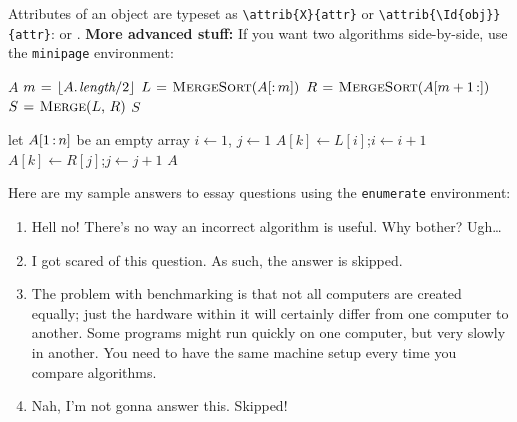 \documentclass[12pt]{article}
\begin{document}
Attributes of an object are typeset as \verb|\attrib{X}{attr}| or \verb|\attrib{\Id{obj}}{attr}|:  or .
\textbf{More advanced stuff:} If you want two algorithms side-by-side, use the \verb|minipage| environment:
\begin{center}
    \begin{minipage}{0.45\textwidth}
    \begin{algorithmic}[1]
            \Return $A$
        \EndIf
        \State $m \mathrel{\hspace{1pt}=\hspace{1pt}} \lfloor A.\hspace*{1pt}\textit{length}/2 \rfloor$
        \State $L \gets \text{\Call{MergeSort}{$A[\subarr m]$}}$
        \State $R \gets \text{\Call{MergeSort}{$A[m+1\subarr]$}}$
        \State $S \gets \text{\Call{Merge}{$L$, $R$}}$
        \Return $S$
    \end{algorithmic}
    \end{minipage}
    \begin{minipage}{0.5\textwidth}
    \begin{algorithmic}[1]
        \State let $A[1\mathinner{:} n]$ be an empty array
        \State $i \gets 1$, $j \gets 1$
                \State $A[k] \gets L[i]$;\quad$i \gets i+1$
            \Else
                \State $A[k] \gets R[j]$;\quad$j \gets j+1$
            \EndIf
        \EndFor
        \Return $A$
    \end{algorithmic}
    \end{minipage}
\end{center}

Here are my sample answers to essay questions using the \verb|enumerate| environment:
\begin{enumerate}
    \item Hell no! There's no way an incorrect algorithm is useful. Why bother? Ugh\ldots
    
    \item I got scared of this question. As such, the answer is skipped.
    
    \item The problem with benchmarking is that not all computers are created equally; just the hardware within it will certainly differ from one computer to another. Some programs might run quickly on one computer, but very slowly in another. You need to have the same machine setup every time you compare algorithms.
    
    \item Nah, I'm not gonna answer this. Skipped!
    
\end{enumerate}
\end{document}
